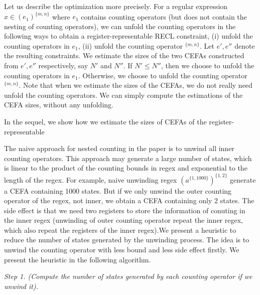 Let us describe the optimization more precisely. For a regular expression $x \in (e_1)^{\{m,n\}}$ where $e_1$ contains counting operators (but does not contain the nesting of counting operators), we can unfold the counting operators in the following ways to obtain a register-representable RECL constraint, (i) unfold the counting operators in $e_1$, (ii) unfold the counting operator $^{\{m,n\}}$. Let $e', e''$ denote the resulting constraints. We estimate the sizes of the two CEFAs constructed from $e', e''$ respectively, say $N'$ and $N''$. If $N' \le N''$, then we choose to unfold the counting operators in $e_1$. Otherwise, we choose to unfold the counting operator $^{\{m,n\}}$. Note that when we estimate the sizes of the CEFAs, we do not really need unfold the counting operators. We can simply compute the estimations of the CEFA sizes, without any unfolding.  


In the sequel, we show how we estimate the sizes of CEFAs of the register-representable 


The naive approach for nested counting in the paper \cite{Denghang2023} is to unwind all inner counting operators. This approach may generate a large number of states, which is linear to the product of the counting bounds in regex and exponential to the length of the regex. For example, naive unwinding regex $(a^{\{1,1000\}})^{\{1,2\}}$ generate a CEFA containing 1000 states. But if we only unwind the outer counting operator of the regex, not inner, we obtain a CEFA containing only 2 states. The side effect is that we need two registers to store the information of conuting in the inner regex (unwinding of outer counting operator repeat the inner regex, which also repeat the registers of the inner regex).We present a heuristic to reduce the number of states generated by the unwinding process. The idea is to unwind the counting operator with less bound and less side effect firstly. We present the heuristic in the following algorithm.

\medskip
\noindent
\emph{Step 1. (Compute the number of states generated by each counting operator if we unwind it).}

